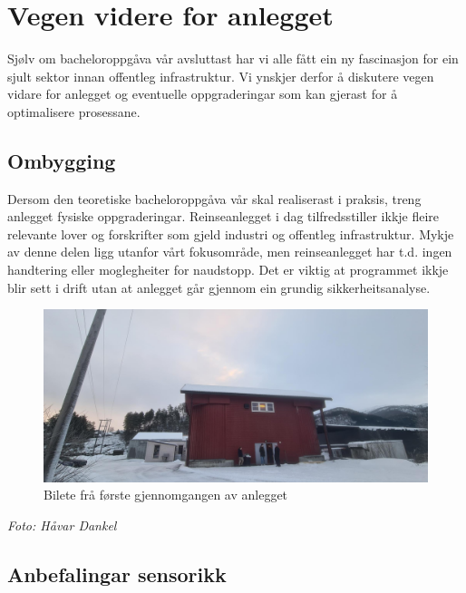 \section{Vegen videre for anlegget}
\thispagestyle{fancy}

Sjølv om bacheloroppgåva vår avsluttast har vi alle fått ein ny fascinasjon for ein sjult sektor innan offentleg infrastruktur. 
Vi ynskjer derfor å diskutere vegen vidare for anlegget og eventuelle oppgraderingar som kan gjerast
for å optimalisere prosessane.


\subsection{Ombygging}

Dersom den teoretiske bacheloroppgåva vår skal realiserast i praksis, treng anlegget fysiske oppgraderingar.
Reinseanlegget i dag tilfredsstiller ikkje fleire relevante lover og forskrifter som gjeld industri og offentleg infrastruktur.
Mykje av denne delen ligg utanfor vårt fokusområde, men reinseanlegget har t.d. ingen handtering eller moglegheiter for naudstopp.
Det er viktig at programmet ikkje blir sett i drift utan at anlegget går gjennom ein grundig sikkerheitsanalyse.

\begin{figure}[htbp]
    \centering
    \includegraphics[width=1\textwidth]{Bilder/SandeGjennomgang.jpg}
    \caption{Bilete frå første gjennomgangen av anlegget}\label{fig:Bilete Gjennomgang}
\end{figure}

\begin{center}
    \textit{Foto: Håvar Dankel}
\end{center}

\newpage

\subsection{Anbefalingar sensorikk}


